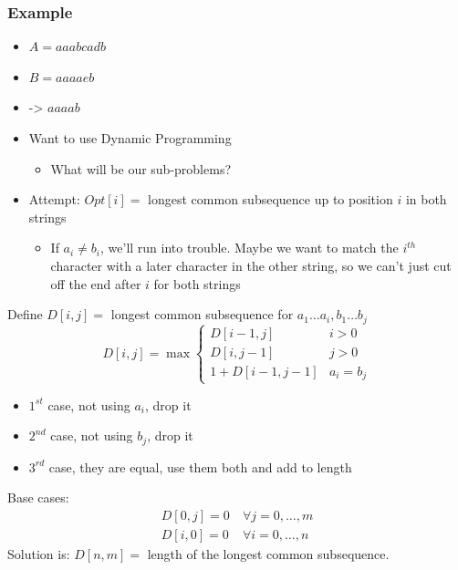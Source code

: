 \documentclass[11pt]{article}
\begin{document}
\subsubsection{Example}
\label{sec:org33b2740}
\begin{itemize}
\item \(A=aaabcadb\)
\item \(B=aaaaeb\)
\item -> \(aaaab\)
\item Want to use Dynamic Programming
\begin{itemize}
\item What will be our sub-problems?
\end{itemize}
\item Attempt: \(Opt[i] =\) longest common subsequence up to position \(i\) in both strings
\begin{itemize}
\item If \(a_i \neq b_i\), we'll run into trouble. Maybe we want to match the \(i^{th}\) character with a later character in the other string, so we can't just cut off the end after \(i\) for both strings
\end{itemize}
\end{itemize}
Define \(D[i,j]=\) longest common subsequence for \(a_1 \ldots a_i, b_1 \ldots b_j\)
\begin{equation*}
D[i,j] = \max 
\begin{cases}
D[i-1, j] & i>0
\\ D[i,j-1] & j>0
\\ 1+D[i-1,j-1] & a_i=b_j
\end{cases}
\end{equation*}
\begin{itemize}
\item \(1^{st}\) case, not using \(a_i\), drop it
\item \(2^{nd}\) case, not using \(b_j\), drop it
\item \(3^{rd}\) case, they are equal, use them both and add to length
\end{itemize}
Base cases: 
\begin{align*}
D[0,j]=0 & \ \forall j=0 , \ldots , m
\\ D[i,0]=0 & \ \forall i=0, \ldots, n
\end{align*}
Solution is: \(D[n,m] =\) length of the longest common subsequence.
\end{document}
